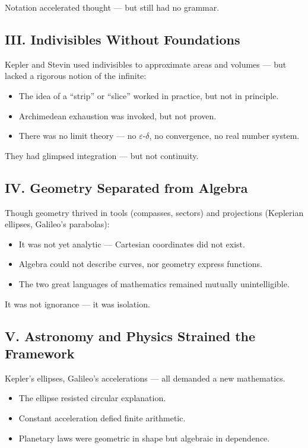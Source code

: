 \documentclass[9pt]{article}
\begin{document}
Notation accelerated thought — but still had no grammar.

\subsection*{III. Indivisibles Without Foundations}

Kepler and Stevin used indivisibles to approximate areas and volumes — but lacked a rigorous notion of the infinite:

\begin{itemize}
    \item The idea of a “strip” or “slice” worked in practice, but not in principle.
    \item Archimedean exhaustion was invoked, but not proven.
    \item There was no limit theory — no $\varepsilon$-$\delta$, no convergence, no real number system.
\end{itemize}

They had glimpsed integration — but not continuity.

\subsection*{IV. Geometry Separated from Algebra}

Though geometry thrived in tools (compasses, sectors) and projections (Keplerian ellipses, Galileo’s parabolas):

\begin{itemize}
    \item It was not yet analytic — Cartesian coordinates did not exist.
    \item Algebra could not describe curves, nor geometry express functions.
    \item The two great languages of mathematics remained mutually unintelligible.
\end{itemize}

It was not ignorance — it was isolation.

\subsection*{V. Astronomy and Physics Strained the Framework}

Kepler’s ellipses, Galileo’s accelerations — all demanded a new mathematics.

\begin{itemize}
    \item The ellipse resisted circular explanation.
    \item Constant acceleration defied finite arithmetic.
    \item Planetary laws were geometric in shape but algebraic in dependence.
\end{itemize}
\end{document}
